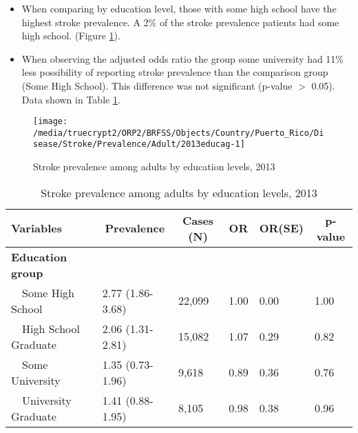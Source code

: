 \newpage
\begin{itemize}

\item When comparing by education level, those with
some high school
have the highest stroke prevalence. A 2\% of the stroke prevalence patients had some high school.
(Figure \ref{fig:edu.Stroke.2013}).

\item 
When observing the adjusted odds ratio the group some university had 11\% less possibility of reporting stroke prevalence than the comparison group (Some High School).
This difference was not significant (p-value $>$ 0.05).  Data shown in Table \ref{tab:edu.Stroke.2013}.

\end{itemize}

\begin{figure}[H]
\caption{Stroke prevalence among adults by education levels, 
         2013}
\begin{knitrout}
\color{fgcolor}

{\centering \texttt{[image: /media/truecrypt2/ORP2/BRFSS/Objects/Country/Puerto\_Rico/Disease/Stroke/Prevalence/Adult/2013educag-1]} 

}



\end{knitrout}
 \label{fig:edu.Stroke.2013}
\end{figure}

\begin{table}[H]
\caption{Stroke prevalence  among adults by education levels, 2013\label{tab:edu.Stroke.2013}} 
\begin{center}
\begin{tabular}{llllll}
\hline\hline
\multicolumn{1}{l}{Variables}&\multicolumn{1}{c}{Prevalence}&\multicolumn{1}{c}{Cases (N)}&\multicolumn{1}{c}{OR}&\multicolumn{1}{c}{OR(SE)}&\multicolumn{1}{c}{p-value}\tabularnewline
\hline
{\bfseries Education group}&&&&&\tabularnewline
~~Some High School&2.77 (1.86-3.68)&22,099&1.00&0.00&1.00\tabularnewline
~~High School Graduate&2.06 (1.31-2.81)&15,082&1.07&0.29&0.82\tabularnewline
~~Some University&1.35 (0.73-1.96)& 9,618&0.89&0.36&0.76\tabularnewline
~~University Graduate&1.41 (0.88-1.95)& 8,105&0.98&0.38&0.96\tabularnewline
\hline
\end{tabular}\end{center}

\end{table}

